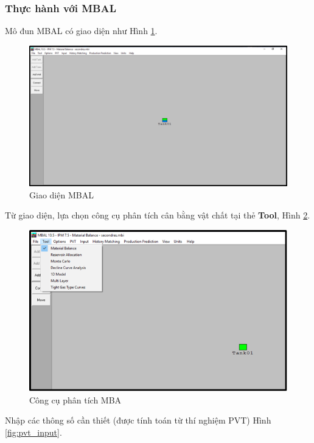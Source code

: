\documentclass[12pt,a4paper]{report}
\begin{document}
	\subsubsection{Thực hành với MBAL}
Mô đun MBAL có giao diện như Hình \ref{fig:interface}.
    	\begin{figure}[h]
        	\centering
            \includegraphics[scale=.6]{Fig/interface.png}
            \caption{Giao diện MBAL}
            \label{fig:interface}
        \end{figure}
        \clearpage
        \noindent
Từ giao diện, lựa chọn công cụ phân tích cân bằng vật chất tại thẻ \textbf{Tool}, Hình \ref{fig:mba_tool}.\\
		\begin{figure}[h]
        	\centering
            \includegraphics[scale=0.9]{Fig/mba_tool.png}
            \caption{Công cụ phân tích MBA}
            \label{fig:mba_tool}
        \end{figure}
        \clearpage
        \noindent
Nhập các thông số cần thiết (được tính toán từ thí nghiệm PVT) Hình \ref{fig:pvt_input}.
\end{document}
